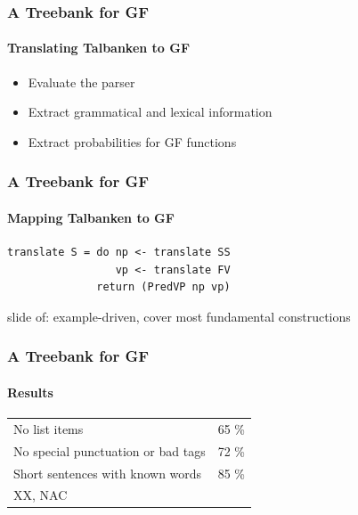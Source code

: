 \documentclass[10pt]{beamer}
\begin{document}
\begin{frame}
\frametitle{A Treebank for GF}
\framesubtitle{Translating Talbanken to GF} 
\begin{itemize}
\item{Evaluate the parser}
\pause
\item{Extract grammatical and lexical information}
\pause
\item{Extract probabilities for GF functions}
\end{itemize}
\end{frame}

\begin{frame}[containsverbatim]
\frametitle{A Treebank for GF}
\framesubtitle{Mapping Talbanken to GF} 
\begin{verbatim}
translate S = do np <- translate SS
                 vp <- translate FV
              return (PredVP np vp)
\end{verbatim}
\end{frame}

\begin{frame}
slide of: example-driven, cover most fundamental constructions
\end{frame}


\begin{frame}[containsverbatim]
\frametitle{A Treebank for GF}
\framesubtitle{Results} 
\begin{tabular}{ll}
No list items & 65 \%\\
No special punctuation or bad tags& 72 \%\\
Short sentences with known words & 85 \%\\
XX, NAC
\end{tabular}
\end{frame}
\end{document}
